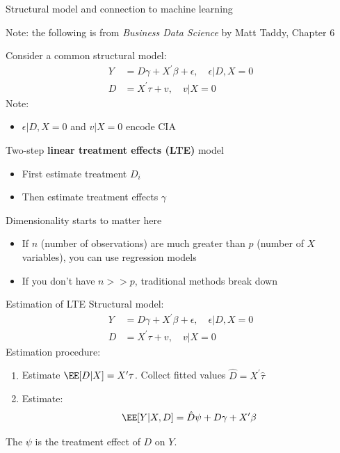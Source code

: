 \documentclass[compress, 8pt]{beamer}
\begin{document}
\begin{frame}{Structural model and connection to machine learning}

Note: the following is from \emph{Business Data Science} by Matt Taddy, Chapter 6

\vspace{3ex}
Consider a common structural model:
\begin{align*}
    Y &= D \gamma + X^\prime \beta + \epsilon, \quad \epsilon \vert D, X = 0 \\
    D &= X^\prime \tau + v, \quad v \vert X = 0
\end{align*}
Note:
\begin{itemize}
    \item $\epsilon \vert D, X = 0$ and $v \vert X = 0$ encode CIA
\end{itemize}
Two-step \textbf{linear treatment effects (LTE)} model
\begin{itemize}
    \item First estimate treatment $D_i$
    \item Then estimate treatment effects $\gamma$
\end{itemize}
Dimensionality starts to matter here
\begin{itemize}
    \item If $n$ (number of observations) are much greater than $p$ (number of $X$ variables), you can use regression models
    \item If you don't have $n>>p$, traditional methods break down
\end{itemize}
\end{frame}

\begin{frame}{Estimation of LTE}
Structural model:
\begin{align*}
    Y &= D \gamma + X^\prime \beta + \epsilon, \quad \epsilon \vert D, X = 0 \\
    D &= X^\prime \tau + v, \quad v \vert X = 0
\end{align*}
Estimation procedure:
\begin{enumerate}
    \item Estimate $\EE [D \vert X] = X^\prime \tau$. Collect fitted values
    $\hat{D} = X^\prime \hat{\tau}$
    \item Estimate:
    \begin{equation*}
        \EE [Y \vert X, D] = \hat{D} \psi + D \gamma + X^\prime \beta
    \end{equation*}
\end{enumerate}
The $\psi$ is the treatment effect of $D$ on $Y$.

\end{frame}
\end{document}
